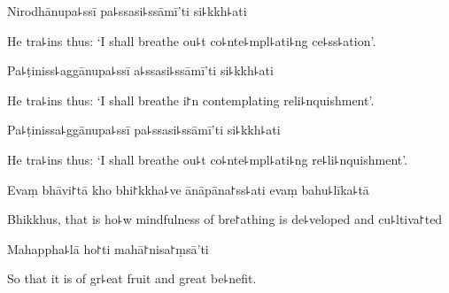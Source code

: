 Nirodhānupa꜕ssī pa꜕ssasi꜕ssāmī'ti si꜕kkh꜕ati

\begin{english}
  He tra꜕ins thus: `I shall breathe ou꜕t co꜕nte꜕mpl꜕ati꜕ng ce꜕ss꜕ation'.
\end{english}

Pa꜕ṭiniss꜕aggānupa꜕ssī a꜕ssasi꜕ssāmī'ti si꜕kkh꜕ati

\begin{english}
  He tra꜕ins thus: `I shall breathe i꜓n contemplating reli꜕nquishment'.
\end{english}

Pa꜕ṭinissa꜕ggānupa꜕ssī pa꜕ssasi꜕ssāmī'ti si꜕kkh꜕ati

\begin{english}
  He tra꜕ins thus: `I shall breathe ou꜕t co꜕nte꜕mpl꜕ati꜕ng re꜕li꜕nquishment'.
\end{english}

Evaṃ bhāvi꜓tā kho bhi꜓kkha꜕ve ānāpāna꜓ss꜕ati evaṃ bahu꜕līka꜕tā

\begin{english}
  Bhikkhus, that is ho꜕w mindfulness of bre꜓athing is de꜕veloped and cu꜕ltiva꜓ted
\end{english}

Mahappha꜕lā ho꜓ti mahā꜓nisa꜓ṃsā'ti

\begin{english}
  So that it is of gr꜕eat fruit and great be꜕nefit.
\end{english}


